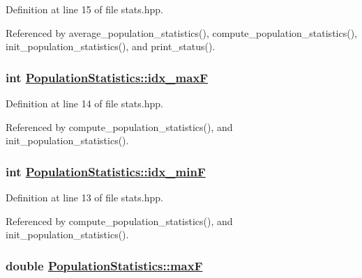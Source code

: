 Definition at line 15 of file stats.hpp.

Referenced by average\_\-population\_\-statistics(), compute\_\-population\_\-statistics(), init\_\-population\_\-statistics(), and print\_\-status().\hypertarget{struct_population_statistics_f65947f9aa3f3b1785247463d276167f}{
\subsubsection[idx\_\-maxF]{\setlength{\rightskip}{0pt plus 5cm}int \hyperlink{struct_population_statistics_f65947f9aa3f3b1785247463d276167f}{Population\-Statistics::idx\_\-max\-F}}}
\label{struct_population_statistics_f65947f9aa3f3b1785247463d276167f}




Definition at line 14 of file stats.hpp.

Referenced by compute\_\-population\_\-statistics(), and init\_\-population\_\-statistics().\hypertarget{struct_population_statistics_b425e54cf69ede6fe860c016dc70a15e}{
\subsubsection[idx\_\-minF]{\setlength{\rightskip}{0pt plus 5cm}int \hyperlink{struct_population_statistics_b425e54cf69ede6fe860c016dc70a15e}{Population\-Statistics::idx\_\-min\-F}}}
\label{struct_population_statistics_b425e54cf69ede6fe860c016dc70a15e}




Definition at line 13 of file stats.hpp.

Referenced by compute\_\-population\_\-statistics(), and init\_\-population\_\-statistics().\hypertarget{struct_population_statistics_66e61b5383e85b625ec35ae77fbc3cd2}{
\subsubsection[maxF]{\setlength{\rightskip}{0pt plus 5cm}double \hyperlink{struct_population_statistics_66e61b5383e85b625ec35ae77fbc3cd2}{Population\-Statistics::max\-F}}}
\label{struct_population_statistics_66e61b5383e85b625ec35ae77fbc3cd2}





